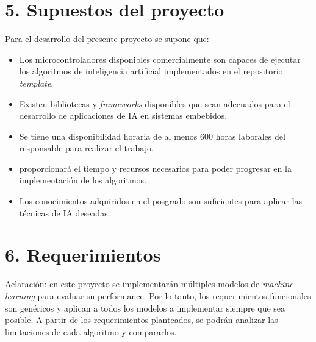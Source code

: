 \documentclass[
11pt, %
codirector, %
]{charter}
\begin{document}
\section{5. Supuestos del proyecto}
\label{sec:supuestos}
Para el desarrollo del presente proyecto se supone que: 
\begin{itemize}
	\item Los microcontroladores disponibles comercialmente son capaces de ejecutar los algoritmos de inteligencia artificial implementados en el repositorio \textit{template}.
	\item Existen bibliotecas y \textit{frameworks} disponibles que sean adecuados para el desarrollo de aplicaciones de IA en sistemas embebidos.
	\item Se tiene una disponibilidad horaria de al menos 600 horas laborales del responsable para realizar el trabajo. 
	\item \empclientename proporcionará el tiempo y recursos necesarios para poder progresar en la implementación de los algoritmos.
	\item Los conocimientos adquiridos en el posgrado son suficientes para aplicar las técnicas de IA deseadas.
\end{itemize}


\section{6. Requerimientos}
\label{sec:requerimientos}

Aclaración: en este proyecto se implementarán múltiples modelos de \textit{machine learning} para evaluar su performance. Por lo tanto, los requerimientos funcionales son genéricos y aplican a todos los modelos a implementar siempre que sea posible. A partir de los requerimientos planteados, se podrán analizar las limitaciones de cada algoritmo y compararlos.
\end{document}
